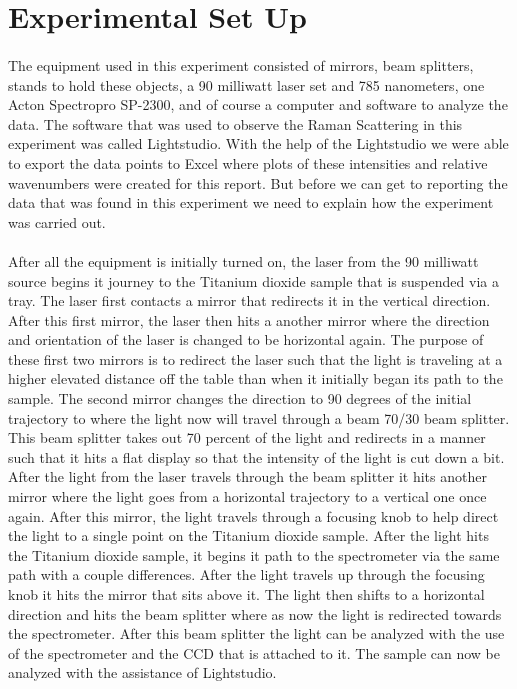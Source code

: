 \documentclass[]{article}
\begin{document}
\section{Experimental Set Up}
\begin{multicols}{2}
\paragraph{}
\setlength{\parskip}{1em}
The equipment used in this experiment consisted of mirrors, beam splitters, stands to hold these objects, a 90 milliwatt laser set and 785 nanometers, one Acton Spectropro SP-2300, and of course a computer and software to analyze the data. The software that was used to observe the Raman Scattering in this experiment was called Lightstudio. With the help of the Lightstudio we were able to export the data points to Excel where plots of these intensities and relative wavenumbers were created for this report. But before we can get to reporting the data that was found in this experiment we need to explain how the experiment was carried out. 
\paragraph{}
\setlength{\parskip}{1em}
After all the equipment is initially turned on, the laser from the 90 milliwatt source begins it journey to the Titanium dioxide sample that is suspended via a tray. The laser first contacts a mirror that redirects it in the vertical direction. After this first mirror, the laser then hits a another mirror where the direction and orientation of the laser is changed to be horizontal again. The purpose of these first two mirrors is to redirect the laser such that the light is traveling at a higher elevated distance off the table than when it initially began its path to the sample. The second mirror changes the direction to 90 degrees of the initial trajectory to where the light now will travel through a beam 70/30 beam splitter. This beam splitter takes out 70 percent of the light and redirects in a manner such that it hits a flat display so that the intensity of the light is cut down a bit. After the light from the laser travels through the beam splitter it hits another mirror where the light goes from a horizontal trajectory to a vertical one once again. After this mirror, the light travels through a focusing knob to help direct the light to a single point on the Titanium dioxide sample. After the light hits the Titanium dioxide sample, it begins it path to the spectrometer via the same path with a couple differences. After the light travels up through the focusing knob it hits the mirror that sits above it. The light then shifts to a horizontal direction and hits the beam splitter where as now the light is redirected towards the spectrometer. After this beam splitter the light can be analyzed with the use of the spectrometer and the CCD that is attached to it. The sample can now be analyzed with the assistance of Lightstudio.
\end{multicols}
\end{document}
